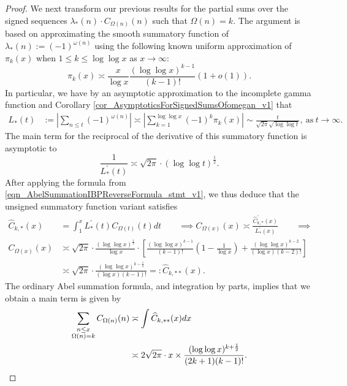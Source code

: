 \documentclass[11pt,reqno,a4letter]{article}
\numberwithin{figure}{section}
\numberwithin{table}{section}
\theoremstyle{plain}
\numberwithin{theorem}{section}
\theoremstyle{definition}
\begin{document}
\begin{proof}
We next transform our previous results for the partial sums over the signed sequences 
$\lambda_{\ast}(n) \cdot C_{\Omega(n)}(n)$ such that $\Omega(n) = k$. 
The argument is based on approximating the smooth summatory function of 
$\lambda_{\ast}(n) := (-1)^{\omega(n)}$ using the following 
known uniform approximation of $\pi_k(x)$ when $1 \leq k \leq \log\log x$ as 
$x \rightarrow \infty$: 
\[
\pi_k(x) \asymp \frac{x}{\log x} \frac{(\log\log x)^{k-1}}{(k-1)!} (1 + o(1)). 
\]
In particular, we have by an asymptotic approximation to the incomplete gamma function and 
Corollary \ref{cor_AsymptoticsForSignedSumsOfomegan_v1} that 
\begin{align*} 
L_{\ast}(t) & := \left\lvert \sum_{n \leq t} (-1)^{\omega(n)} \right\rvert \asymp 
     \left\lvert \sum_{k=1}^{\log\log x} (-1)^{k} \pi_k(x) \right\rvert \sim 
     \frac{t}{\sqrt{2\pi} \sqrt{\log\log t}}, \mathrm{\ as\ } t \rightarrow \infty. 
\end{align*} 
The main term for the reciprocal of the derivative of this summatory function is 
asymptotic to
\[
\frac{1}{L_{\ast}^{\prime}(t)} \asymp \sqrt{2\pi} \cdot (\log\log t)^{\frac{1}{2}}. 
\]
After applying the formula from \eqref{eqn_AbelSummationIBPReverseFormula_stmt_v1},  
we thus deduce that the unsigned summatory function variant satisfies 
\begin{align*} 
\widehat{C}_{k,\ast}(x) & = \int_1^{x} L_{\ast}^{\prime}(t) C_{\Omega(t)}(t) dt \qquad \implies 
C_{\Omega(x)}(x) \asymp \frac{\widehat{C}_{k,\ast}^{\prime}(x)}{L_{\ast}^{\prime}(x)} \qquad \implies \\ 
C_{\Omega(x)}(x) & \asymp \sqrt{2\pi} \cdot \frac{(\log\log x)^{\frac{1}{2}}}{\log x} \cdot  
     \left[\frac{(\log\log x)^{k-1}}{(k-1)!} \left(1 - 
     \frac{1}{\log x}\right) + \frac{(\log\log x)^{k-2}}{(\log x) (k-2)!}\right] \\ 
     & \asymp \sqrt{2\pi} \cdot \frac{(\log\log x)^{k-\frac{1}{2}}}{(\log x) (k-1)!} 
     =: \widehat{C}_{k,\ast\ast}(x). 
\end{align*} 
The ordinary Abel summation formula, and integration by parts, implies that we obtain a 
main term is given by 
\begin{align*} 
\sum_{\substack{n \leq x \\ \Omega(n)=k}} C_{\Omega(n)}(n) & \asymp 
     \int \widehat{C}_{k,\ast\ast}(x)dx \\ 
     & \asymp 2\sqrt{2\pi} \cdot x \times 
     \frac{(\log\log x)^{k+\frac{1}{2}}}{(2k+1)(k-1)!}. 
     \qedhere 
\end{align*} 
\end{proof}
\end{document}
